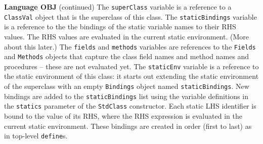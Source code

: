 \begin{minipage}[t]{\sw}
\slidenumber
\LARGE
{\bf Language OBJ} (continued)\exx
The \verb'superClass' variable is a reference
to a \verb'ClassVal' object
that is the superclass of this class.
The \verb'staticBindings' variable is a reference
to the the bindings of the static variable names
to their RHS values.
The RHS values are evaluated in the current static environment.
(More about this later.)\exx
The \verb'fields' and \verb'methods' variables are references
to the \verb'Fields' and \verb'Methods' objects
that capture the class field names
and method names
and procedures -- these are not evaluated yet.\exx
The \verb'staticEnv' variable is a reference
to the static environment of this class:
it starts out extending the static environment of the superclass
with an empty \verb'Bindings' object named \verb'staticBindings'.
New bindings are added to the \verb'staticBindings' list
using the variable definitions
in the \verb'statics' parameter of the \verb'StdClass' constructor.
Each static LHS identifier is bound to the value of its RHS,
where the RHS expression is evaluated in the current static environment.
These bindings are created in order (first to last)
as in top-level \verb'define's.\exx
\end{minipage}
